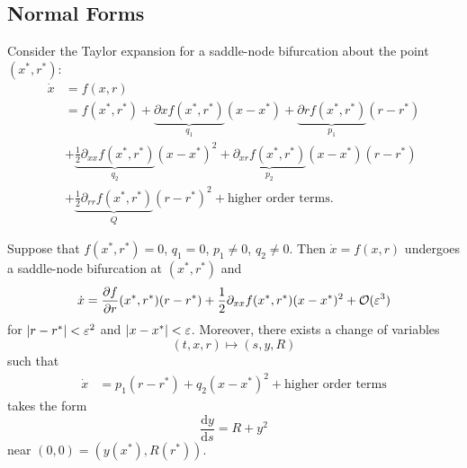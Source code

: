 \documentclass[class=article, crop=false]{standalone}
\begin{document}
  \subsection{Normal Forms}
  Consider the Taylor expansion for a saddle-node bifurcation about the point $(x^*, r^*)$:
  \begin{align*}
    \dot{x} &= f(x, r) \\
            &= f(x^*, r^*) + \underbrace{\partial x f(x^*, r^*)}_{q_1}(x - x^*) + \underbrace{\partial r f(x^*, r^*)}_{p_1}(r - r^*) \\
            &+ \underbrace{\frac{1}{2}\partial_{xx} f(x^*, r^*)}_{q_2}(x - x^*)^2 + \underbrace{\partial_{xr} f(x^*, r^*)}_{p_2}(x - x^*)(r - r^*) \\
            &+ \underbrace{\frac{1}{2}\partial_{rr} f(x^*, r^*)}_{Q}(r - r^*)^2 + \text{higher order terms}.
  \end{align*}
  \begin{theorem}{}
    Suppose that $f(x^*, r^*) = 0$, $q_1 = 0$, $p_1\neq 0$, $q_2\neq 0$. Then $\dot{x} = f(x, r)$ undergoes a saddle-node bifurcation at $(x^*, r^*)$ and
    \[
      \dot{x} = \frac{\partial f}{\partial r}(x^*, r^*)(r - r^*) + \frac{1}{2}\partial_{xx} f(x^*, r^*)(x - x^*)^2 + \mathcal{O}(\varepsilon^3)
    \]
    for $\left\lvert r - r^* \right\rvert < \varepsilon^2$ and $\left\lvert x - x^* \right\rvert < \varepsilon$. Moreover, there exists a change of variables
    \[
      (t, x, r)\mapsto (s, y, R)
    \]
    such that
    \begin{align*}
      \dot{x} &= p_1(r - r^*) + q_2(x - x^*)^2 + \text{higher order terms}
    \end{align*}
    takes the form
    \[
      \frac{\mathrm{d}y}{\mathrm{d}s} = R + y^2\tag{Saddle-node bifurcation}
    \]
    near $(0, 0) = (y(x^*), R(r^*))$.
  \end{theorem}
\end{document}
